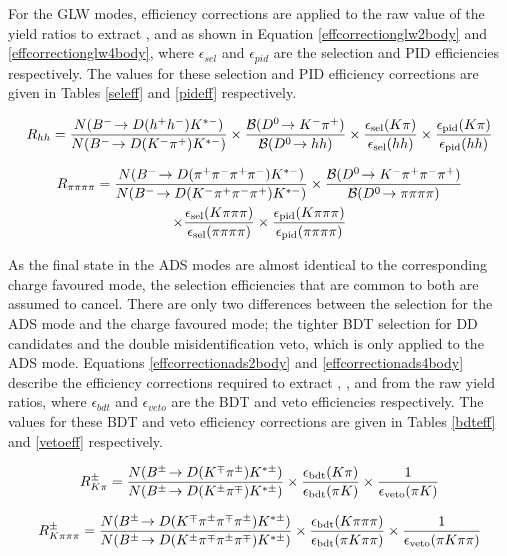 For the GLW modes, efficiency corrections are applied to the raw value of the yield ratios to extract \Rkk, \Rpipi and \Rpipipipi as shown in Equation \ref{effcorrectionglw2body} and \ref{effcorrectionglw4body}, where $\epsilon_{sel}$ and $\epsilon_{pid}$ are the selection and PID efficiencies respectively. The values for these selection and PID efficiency corrections are given in Tables \ref{seleff} and \ref{pideff} respectively.

{\footnotesize
\begin{equation}
R_{hh} = \frac{N({{{B}^-}}\!\rightarrow {\ensuremath{D}}(h^+h^-){{K}^{*-}})}{N({{{B}^-}}\!\rightarrow {\ensuremath{D}}({{K}^-}{{\pi}^+}){{K}^{*-}})} \times \frac{{\mathcal{B}}({{D}^0}\!\rightarrow {\ensuremath{{K}^-}}{\ensuremath{{\pi}^+}})}{{\mathcal{B}}({{D}^0}\!\rightarrow hh)} \times \frac{\epsilon_{\text{sel}}(K\pi)}{\epsilon_{\text{sel}}(hh)} \times \frac{\epsilon_{\text{pid}}(K\pi)}{\epsilon_{\text{pid}}(hh)}
\label{effcorrectionglw2body}
\end{equation}

\begin{multline}
R_{\pi\pi\pi\pi} = \frac{N({{{B}^-}}\!\rightarrow {\ensuremath{D}}({{\pi}^+}{{\pi}^-}{{\pi}^+}{{\pi}^-}){{K}^{*-}})}{N({{{B}^-}}\!\rightarrow {\ensuremath{D}}({{K}^-}{{\pi}^+}{{\pi}^-}{{\pi}^+}){{K}^{*-}})} \times \frac{{\mathcal{B}}({{D}^0}\!\rightarrow {\ensuremath{{K}^-}}{\ensuremath{{\pi}^+}}{\ensuremath{{\pi}^-}}{\ensuremath{{\pi}^+}})}{{\mathcal{B}}({{D}^0}\!\rightarrow \pi\pi\pi\pi)} \\ \times \frac{\epsilon_{\text{sel}}(K\pi\pi\pi)}{\epsilon_{\text{sel}}(\pi\pi\pi\pi)} \times \frac{\epsilon_{\text{pid}}(K\pi\pi\pi)}{\epsilon_{\text{pid}}(\pi\pi\pi\pi)} 
\label{effcorrectionglw4body}
\end{multline}}

As the final state in the ADS modes are almost identical to the corresponding charge favoured mode, the selection efficiencies that are common to both are assumed to cancel. There are only two differences between the selection for the ADS mode and the charge favoured mode; the tighter BDT selection for DD candidates and the double misidentification veto, which is only applied to the ADS mode. Equations \ref{effcorrectionads2body} and \ref{effcorrectionads4body} describe the efficiency corrections required to extract \Rptwo, \Rmtwo, \Rpfour and \Rmfour from the raw yield ratios, where $\epsilon_{bdt}$ and $\epsilon_{veto}$ are the BDT and veto efficiencies respectively. The values for these BDT and veto efficiency corrections are given in Tables \ref{bdteff} and \ref{vetoeff} respectively.

{\footnotesize
\begin{equation}
R^{\pm}_{K\pi} = \frac{N({{B}^\pm}\!\rightarrow {\ensuremath{D}}({{K}^\mp}{{\pi}^\pm}){{K}^{*\pm}})}{N({{B}^\pm}\!\rightarrow {\ensuremath{D}}({{K}^\pm}{{\pi}^\mp}){{K}^{*\pm}})} \times \frac{\epsilon_{\text{bdt}}(K\pi)}{\epsilon_{\text{bdt}}(\pi K)} \times \frac{1}{\epsilon_{\text{veto}}(\pi K)}
\label{effcorrectionads2body}
\end{equation}

\begin{equation}
R^{\pm}_{K\pi\pi\pi} = \frac{N({{B}^\pm}\!\rightarrow {\ensuremath{D}}({{K}^\mp}{{\pi}^\pm}{{\pi}^\mp}{{\pi}^\pm}){{K}^{*\pm}})}{N({{B}^\pm}\!\rightarrow {\ensuremath{D}}({{K}^\pm}{{\pi}^\mp}{{\pi}^\pm}{{\pi}^\mp}){{K}^{*\pm}})} \times \frac{\epsilon_{\text{bdt}}(K\pi\pi\pi)}{\epsilon_{\text{bdt}}(\pi K\pi\pi)} \times \frac{1}{\epsilon_{\text{veto}}(\pi K\pi\pi)}
\label{effcorrectionads4body}
\end{equation}}

